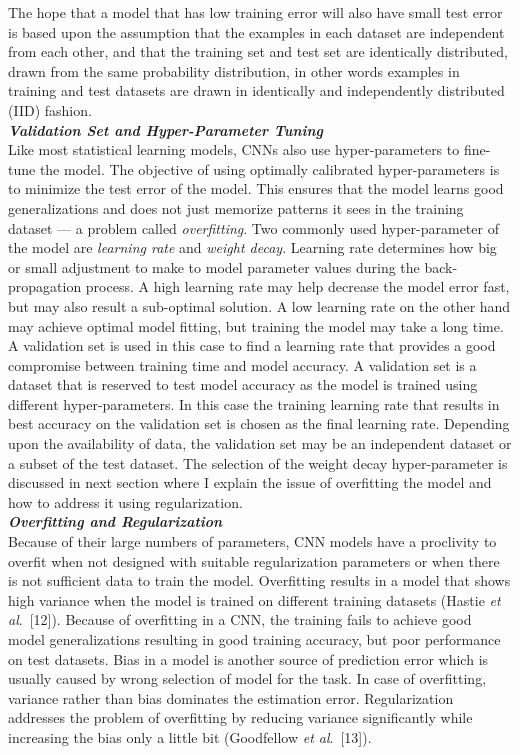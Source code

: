 \documentclass [11pt,letterpaper ,twoside ,openany ]{report}
\begin{document}
    The hope that a model that has low training error will also have small test error is based upon the assumption that the examples in each dataset are independent from each other, and that the training set and test set are identically distributed, drawn from the same probability distribution, in other words examples in training and test datasets are drawn in identically and independently distributed (IID) fashion.\\

    
    \noindent
    \textbf{\textit{Validation Set and Hyper-Parameter Tuning}}\\
    Like most statistical learning models, CNNs also use hyper-parameters to fine-tune the model. The objective of using optimally calibrated hyper-parameters is to minimize the test error of the model. This ensures that the model learns good generalizations and does not just memorize patterns it sees in the training dataset --- a problem called \textit{overfitting}. Two commonly used hyper-parameter of the model are \textit{learning rate} and \textit{weight decay}. Learning rate determines how big or small adjustment to make to model parameter values during the back-propagation process. A high learning rate may help decrease the model error fast, but may also result a sub-optimal solution. A low learning rate on the other hand may achieve optimal model fitting, but training the model may take a long time. A validation set is used in this case to find a learning rate that provides a good compromise between training time and model accuracy. A validation set is a dataset that is reserved to test model accuracy as the model is trained using different hyper-parameters. In this case the training learning rate that results in best accuracy on the validation set is chosen as the final learning rate. Depending upon the availability of data, the validation set may be an independent dataset or a subset of the test dataset. The selection of the weight decay hyper-parameter is discussed in next section where I explain the issue of overfitting the model and how to address it using regularization.\\

    \noindent
    \textbf{\textit{Overfitting and Regularization}}\\    
    Because of their large numbers of parameters, CNN models have a proclivity to overfit when not designed with suitable regularization parameters or when there is not sufficient data to train the model. Overfitting results in a model that shows high variance when the model is trained on different training datasets (Hastie \textit{et al}.\ [12]). Because of overfitting in a CNN, the training fails to achieve good model generalizations resulting in good training accuracy, but poor performance on test datasets. Bias in a model is another source of prediction error which is usually caused by wrong selection of model for the task. In case of overfitting, variance rather than bias dominates the estimation error. Regularization addresses the problem of overfitting by reducing variance significantly while increasing the bias only a little bit (Goodfellow \textit{et al}.\ [13]). 
\end{document}
